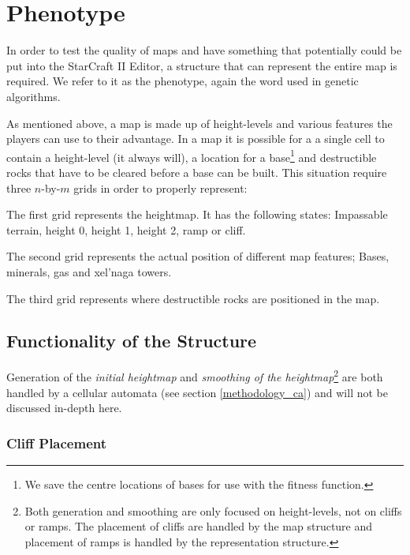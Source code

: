 \section{Phenotype}
\label{methodology_phenotype}

In order to test the quality of maps and have something that potentially could be put into the StarCraft II Editor, a structure that can represent the entire map is required. We refer to it as the phenotype, again the word used in genetic algorithms.

As mentioned above, a map is made up of height-levels and various features the players can use to their advantage. In a map it is possible for a a single cell to contain a height-level (it always will), a location for a base\footnote{We save the centre locations of bases for use with the fitness function.} and destructible rocks that have to be cleared before a base can be built. This situation require three $n$-by-$m$ grids in order to properly represent:

\begin{my_itemize}

	\item The first grid represents the heightmap. It has the following states: Impassable terrain, height 0, height 1, height 2, ramp or cliff.

	\item The second grid represents the actual position of different map features; Bases, minerals, gas and xel'naga towers.

	\item The third grid represents where destructible rocks are positioned in the map.

\end{my_itemize}

\subsection{Functionality of the Structure}
\label{methodology_phenotype_functionality}

Generation of the \textit{initial heightmap} and \textit{smoothing of the heightmap}\footnote{Both generation and smoothing are only focused on height-levels, not on cliffs or ramps. The placement of cliffs are handled by the map structure and placement of ramps is handled by the representation structure.} are both handled by a cellular automata (see section \ref{methodology_ca}) and will not be discussed in-depth here.

\subsubsection*{Cliff Placement}

